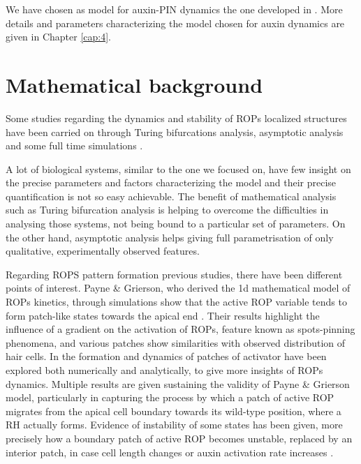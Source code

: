 We have chosen as model for auxin-PIN dynamics the one developed in \cite{plant:Farcot}. More details and parameters characterizing the model chosen for auxin dynamics are given in Chapter \ref{cap:4}.


\section{Mathematical background}
Some studies regarding the dynamics and stability of ROPs localized structures have been carried on through Turing bifurcations analysis, asymptotic analysis and some full time simulations \cite{intra2:14}.

A lot of biological systems, similar to the one we focused on, have few insight on the precise parameters and factors characterizing the model and their precise quantification is not so easy achievable. The benefit of mathematical analysis such as Turing bifurcation analysis is helping to overcome the difficulties in analysing those systems, not being bound to a particular set of parameters. On the other hand, asymptotic analysis helps giving full parametrisation of only qualitative, experimentally observed features.

Regarding ROPS pattern formation previous studies, there have been different points of interest. Payne \& Grierson, who derived the 1d mathematical model of ROPs kinetics, through simulations show that the active ROP variable tends to form patch-like states towards the apical end \cite{payne}. Their results highlight the influence of a gradient on the activation of ROPs, feature known as spots-pinning phenomena, and various patches show similarities with observed distribution of hair cells.
In \cite{phdthesis:victor} the formation and dynamics of patches of activator have been explored both numerically and analytically, to give more insights of ROPs dynamics. Multiple results are given sustaining the validity of Payne \& Grierson model, particularly in capturing the process by which a patch of active ROP migrates from the apical cell boundary towards its wild-type position, where a RH actually forms. Evidence of instability of some states has been given, more precisely how a boundary patch of active ROP becomes unstable, replaced by an interior patch, in case cell length changes or auxin activation rate increases \cite{intra2:26, phdthesis:victor}.

